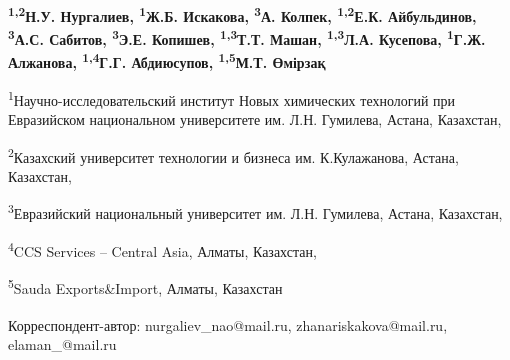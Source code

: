 
\begin{articleheader}

{\bfseries
\textsuperscript{1,2}Н.У. Нургалиев\textsuperscript{\envelope },
\textsuperscript{1}Ж.Б. Искакова\textsuperscript{\envelope },
\textsuperscript{3}А. Колпек,
\textsuperscript{1,2}Е.К. Айбульдинов\textsuperscript{\envelope },
\textsuperscript{3}А.С. Сабитов,
\textsuperscript{3}Э.Е. Копишев,
\textsuperscript{1,3}Т.Т. Машан,
\textsuperscript{1,3}Л.А. Кусепова,
\textsuperscript{1}Г.Ж. Алжанова,
\textsuperscript{1,4}Г.Г. Абдиюсупов,
\textsuperscript{1,5}М.Т. Өмірзақ
}
\end{articleheader}

\begin{affiliation}
\textsuperscript{1}Научно-исследовательский институт Новых химических технологий при Евразийском национальном университете им. Л.Н. Гумилева, Астана, Казахстан,

\textsuperscript{2}Казахский университет технологии и бизнеса им. К.Кулажанова, Астана, Казахстан,

\textsuperscript{3}Евразийский национальный университет им. Л.Н. Гумилева, Астана, Казахстан,

\textsuperscript{4}CCS Services -- Central Asia, Алматы, Казахстан,

\textsuperscript{5}Sauda Exports\&Import, Алматы, Казахстан

\raggedright \textsuperscript{\envelope }Корреспондент-автор: nurgaliev\_nao@mail.ru, zhanariskakova@mail.ru, elaman\_@mail.ru
\end{affiliation}

